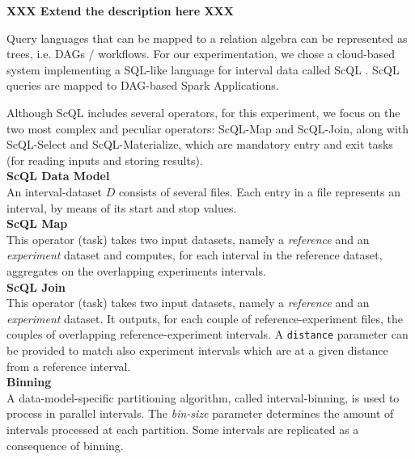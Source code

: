 \documentclass[a4paper, 10pt, conference]{ieeeconf}      %
\begin{document}
\textbf{XXX Extend the description here XXX}

Query languages that can be mapped to a relation algebra can be represented as trees, i.e. DAGs / workflows.
For our experimentation, we chose a cloud-based system implementing a SQL-like language for interval data called ScQL \cite{ScQL}. ScQL queries are mapped to DAG-based Spark Applications.

Although ScQL includes several operators, for this experiment, we focus on the two most complex and peculiar operators: ScQL-Map and ScQL-Join, along with ScQL-Select and ScQL-Materialize, which are mandatory entry and exit tasks (for reading inputs and storing results).   \\

\noindent\textbf{ScQL Data Model}\\
An interval-dataset $D$ consists of several files. Each entry in a file represents an interval, by means of its start and stop values.\\

\noindent\textbf{ScQL Map}\\
This operator (task) takes two input datasets, namely a \textit{reference} and an \textit{experiment} dataset and computes, for each interval in the reference dataset, aggregates on the overlapping experiments intervals. \\

\noindent\textbf{ScQL Join}\\
This operator (task) takes two input datasets, namely a \textit{reference} and an \textit{experiment} dataset. It outputs, for each couple of reference-experiment files, the couples of overlapping reference-experiment intervals.  A \texttt{distance} parameter can be provided to match also experiment intervals which are at a given distance from a reference interval.  \\

\noindent\textbf{Binning}\\
A data-model-specific partitioning algorithm, called interval-binning, is used to process in parallel intervals. The \textit{bin-size} parameter determines the amount of intervals processed at each partition. Some intervals are replicated as a consequence of binning.

\end{document}

